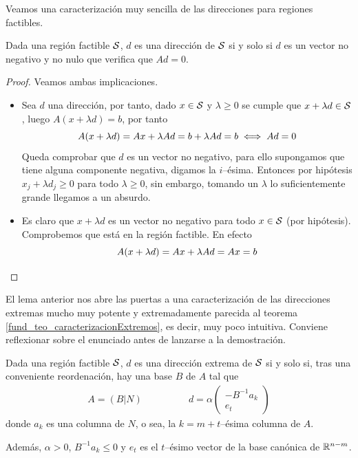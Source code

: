 Veamos una caracterización muy sencilla de las direcciones para regiones factibles.
\begin{lem}
	Dada una región factible $\mathcal{S}$, $d$ es una dirección de $\mathcal{S}$ si y solo si $d$ es un vector no negativo y no nulo que verifica que $Ad=0$.
\end{lem}
\begin{proof}Veamos ambas implicaciones.
	\begin{itemize}
		\item[\bra] Sea $d$ una dirección, por tanto, dado $x\in\mathcal{S}$ y $\lambda\geq 0$ se cumple que $x+\lambda d\in\mathcal{S}$, luego $A(x+\lambda d)=b$, por tanto
		\begin{equation*}
			A(x+\lambda d)=Ax+\lambda Ad=b+\lambda A d = b\iff A d = 0
		\end{equation*}
		Queda comprobar que $d$ es un vector no negativo, para ello supongamos que tiene alguna componente negativa, digamos la $i$--ésima. Entonces por hipótesis $x_j+\lambda d_j\geq 0$ para todo $\lambda\geq 0$, sin embargo, tomando un $\lambda$ lo suficientemente grande llegamos a un absurdo.
		\item[\bla] Es claro que $x+\lambda d$ es un vector no negativo para todo $x\in\mathcal{S}$ (por hipótesis). Comprobemos que está en la región factible. En efecto
		\begin{equation*}
			A(x+\lambda d)=Ax+\lambda Ad=Ax=b \qedhere
		\end{equation*}
	\end{itemize}
\end{proof}
El lema anterior nos abre las puertas a una caracterización de las direcciones extremas mucho muy potente y extremadamente parecida al teorema \ref{fund_teo_caracterizacionExtremos}, es decir, muy poco intuitiva. Conviene reflexionar sobre el enunciado antes de lanzarse a la demostración.
\begin{theo}
	\label{fund_teo_caracterizacionDireccionesExtremas}
	Dada una región factible $\mathcal{S}$, $d$ es una dirección extrema de $\mathcal{S}$ si y solo si, tras una conveniente reordenación, hay una base $B$ de $A$ tal que
	\begin{equation*}
		\begin{array}{cc}
		A=(B|N)\qquad&\qquad d=\alpha\begin{pmatrix}
		-B^{-1}a_k\\
		e_t
		\end{pmatrix}
		\end{array}
	\end{equation*}
	donde $a_k$ es una columna de $N$, o sea, la $k=m+t$--ésima columna de $A$.
	
	Además, $\alpha>0$, $B^{-1}a_k\leq 0$ y $e_t$ es el $t$--ésimo vector de la base canónica de $\mathbb{R}^{n-m}$.
\end{theo}
